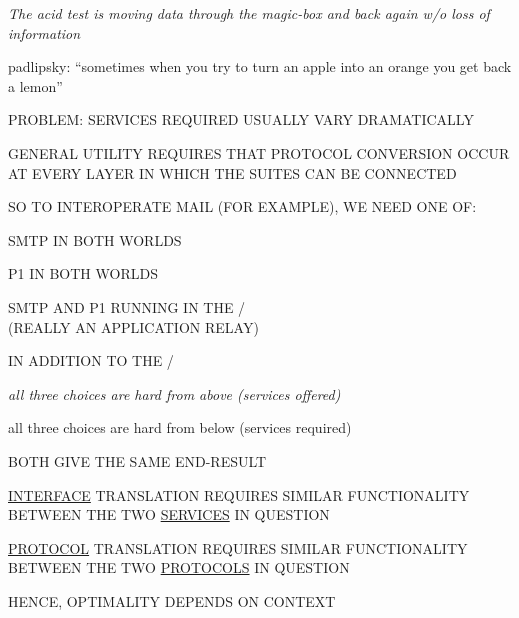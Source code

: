 \begin{note}\em
The acid test is moving data through the magic-box and back again w/o loss
of information

padlipsky: ``sometimes when you try to turn an apple into an orange you get
back a lemon''
\end{note}


\begin{bwslide}

PROBLEM: SERVICES REQUIRED USUALLY VARY DRAMATICALLY

\vspace{0.25in}
\end{bwslide}


\begin{bwslide}

GENERAL UTILITY REQUIRES THAT PROTOCOL CONVERSION OCCUR AT EVERY LAYER
IN WHICH THE SUITES CAN BE CONNECTED
\end{bwslide}


\begin{bwslide}

SO TO INTEROPERATE MAIL (FOR EXAMPLE), WE NEED ONE OF:
\begin{nrtc}
\item	SMTP IN BOTH WORLDS

\item	P1 IN BOTH WORLDS

\item	SMTP AND P1 RUNNING IN THE \tcptpgw/\\
	(REALLY AN APPLICATION RELAY)
\end{nrtc}
IN ADDITION TO THE \tcptpgw/
\end{bwslide}


\begin{note}\em
all three choices are hard from above (services offered)

all three choices are hard from below (services required)
\end{note}


\begin{bwslide}

\begin{nrtc}
\item	BOTH GIVE THE SAME END-RESULT

\item	\underline{INTERFACE} TRANSLATION REQUIRES SIMILAR FUNCTIONALITY
	BETWEEN THE TWO \underline{SERVICES} IN QUESTION

\item	\underline{PROTOCOL} TRANSLATION REQUIRES SIMILAR FUNCTIONALITY\\
	BETWEEN THE TWO \underline{PROTOCOLS} IN QUESTION

\item	HENCE, OPTIMALITY DEPENDS ON CONTEXT
\end{nrtc}
\end{bwslide}


